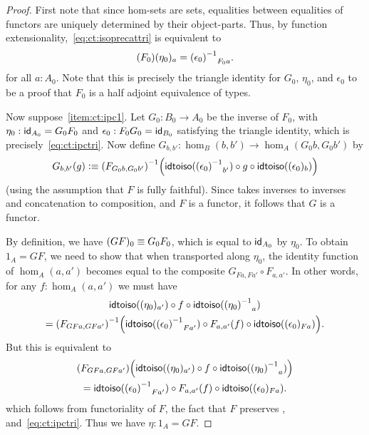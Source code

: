 \documentclass[hott-all.tex]{subfiles}
\begin{document}
\begin{proof}
  First note that since hom-sets are sets, equalities between equalities of functors are uniquely determined by their object-parts.
  Thus, by function extensionality,~\eqref{eq:ct:isoprecattri} is equivalent to
  \begin{equation}
    \map{(F_0)}{\eta_0}_a = \opp{(\epsilon_0)}_{F_0 a}.\label{eq:ct:ipctri}
  \end{equation}
  for all $a:A_0$.
  Note that this is precisely the triangle identity for $G_0$, $\eta_0$, and $\epsilon_0$ to be a proof that $F_0$ is a half adjoint equivalence of types.

  Now suppose~\ref{item:ct:ipc1}.
  Let $G_0:B_0 \to A_0$ be the inverse of $F_0$, with $\eta_0: \idfunc[A_0] = G_0 F_0$ and $\epsilon_0:F_0G_0 = \idfunc[B_0]$ satisfying the triangle identity, which is precisely~\eqref{eq:ct:ipctri}.
  Now define $G_{b,b'}:\hom_B(b,b') \to \hom_A(G_0b,G_0b')$ by
  \[ G_{b,b'}(g) \defeq
  \inv{(F_{G_0b,G_0b'})}\Big(\idtoiso(\opp{(\epsilon_0)}_{b'}) \circ g \circ \idtoiso((\epsilon_0)_b)\Big)
  \]
  (using the assumption that $F$ is fully faithful).
  Since \idtoiso takes inverses to inverses and concatenation to composition, and $F$ is a functor, it follows that $G$ is a functor.

  By definition, we have $(GF)_0 \jdeq G_0 F_0$, which is equal to $\idfunc[A_0]$ by $\eta_0$.
  To obtain $1_A = GF$, we need to show that when transported along $\eta_0$, the identity function of $\hom_A(a,a')$ becomes equal to the composite $G_{Fa,Fa'} \circ F_{a,a'}$.
  In other words, for any $f:\hom_A(a,a')$ we must have
  \begin{multline*}
    \idtoiso((\eta_0)_{a'}) \circ f \circ \idtoiso(\opp{(\eta_0)}_a)\\
    = \inv{(F_{GFa,GFa'})}\Big(\idtoiso(\opp{(\epsilon_0)}_{Fa'})
    \circ F_{a,a'}(f) \circ \idtoiso((\epsilon_0)_{Fa})\Big).
  \end{multline*}
  But this is equivalent to
  \begin{multline*}
    (F_{GFa,GFa'})\Big(\idtoiso((\eta_0)_{a'}) \circ f \circ \idtoiso(\opp{(\eta_0)}_a)\Big)\\
    = \idtoiso(\opp{(\epsilon_0)}_{Fa'})
    \circ F_{a,a'}(f) \circ \idtoiso((\epsilon_0)_{Fa}).
  \end{multline*}
  which follows from functoriality of $F$, the fact that $F$ preserves \idtoiso, and~\eqref{eq:ct:ipctri}.
  Thus we have $\eta:1_A = GF$.


\end{proof}
\end{document}
